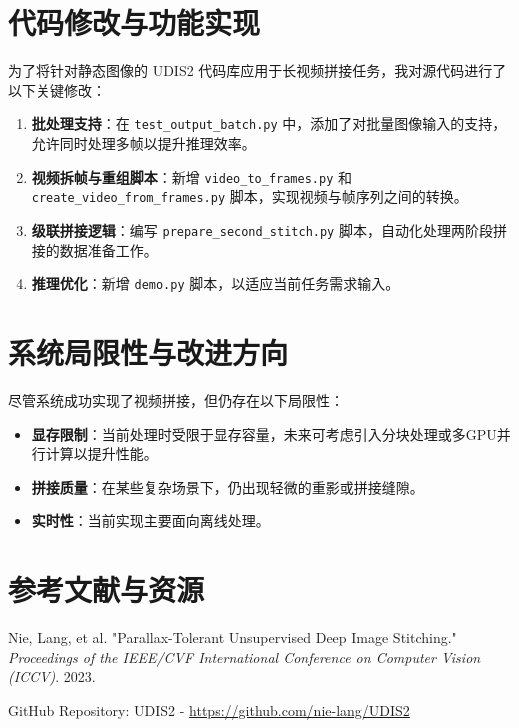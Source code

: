 \documentclass[a4paper,12pt]{article}
\begin{document}
\section{代码修改与功能实现}

为了将针对静态图像的 UDIS2 代码库应用于长视频拼接任务，我对源代码进行了以下关键修改：

\begin{enumerate}
    \item \textbf{批处理支持}：在 \texttt{test\_output\_batch.py} 中，添加了对批量图像输入的支持，允许同时处理多帧以提升推理效率。
    \item \textbf{视频拆帧与重组脚本}：新增 \texttt{video\_to\_frames.py} 和 \texttt{create\_video\_from\_frames.py} 脚本，实现视频与帧序列之间的转换。
    \item \textbf{级联拼接逻辑}：编写 \texttt{prepare\_second\_stitch.py} 脚本，自动化处理两阶段拼接的数据准备工作。
    \item \textbf{推理优化}：新增 \texttt{demo.py} 脚本，以适应当前任务需求输入。
\end{enumerate}

\section{系统局限性与改进方向}

尽管系统成功实现了视频拼接，但仍存在以下局限性：

\begin{itemize}
    \item \textbf{显存限制}：当前处理时受限于显存容量，未来可考虑引入分块处理或多GPU并行计算以提升性能。
    \item \textbf{拼接质量}：在某些复杂场景下，仍出现轻微的重影或拼接缝隙。
    \item \textbf{实时性}：当前实现主要面向离线处理。
\end{itemize}

\section{参考文献与资源}

\begin{enumerate}[label={[\arabic*]}]
    \item Nie, Lang, et al. "Parallax-Tolerant Unsupervised Deep Image Stitching." \textit{Proceedings of the IEEE/CVF International Conference on Computer Vision (ICCV)}. 2023.
    \item GitHub Repository: UDIS2 - \url{https://github.com/nie-lang/UDIS2}
\end{enumerate}
\end{document}

